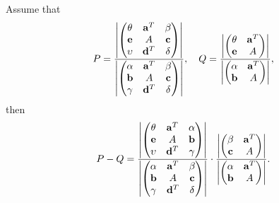 \begin{lemma}
\label{Lem: 4-SCH-EXP}
Assume that $$P = \frac{\left| \begin{pmatrix}
      \theta & \mathbf a^{T} & \beta  \\
        \mathbf e & A & \mathbf c \\
        \upsilon & \mathbf d^T & \delta 
    \end{pmatrix}\right|}{ \left| \begin{pmatrix}
      \alpha & \mathbf a^{T} & \beta  \\
        \mathbf b & A & \mathbf c \\
        \gamma & \mathbf d^T & \delta 
    \end{pmatrix}\right|  },\quad Q =\frac{ \left| \begin{pmatrix}
      \theta & \mathbf a^{T} \\
        \mathbf e & A  
    \end{pmatrix}\right|  }{  \left| \begin{pmatrix}
      \alpha & \mathbf a^{T} \\
        \mathbf b & A  
    \end{pmatrix}\right|},$$ then 
\begin{equation}
\begin{aligned}
P-Q = \frac{\left| \begin{pmatrix}
      \theta & \mathbf a^{T} & \alpha \\
        \mathbf e & A & \mathbf b \\
        \upsilon & \mathbf d^T & \gamma 
    \end{pmatrix}\right|}{ \left| \begin{pmatrix}
      \alpha & \mathbf a^{T} & \beta  \\
        \mathbf b & A & \mathbf c \\
        \gamma & \mathbf d^T & \delta 
    \end{pmatrix}\right|  } \cdot \frac{ \left| \begin{pmatrix}
      \beta & \mathbf a^{T} \\
        \mathbf c & A  
    \end{pmatrix}\right|  }{  \left| \begin{pmatrix}
      \alpha & \mathbf a^{T} \\
        \mathbf b & A  
    \end{pmatrix}\right|}.
\end{aligned}
\end{equation}
\end{lemma}

